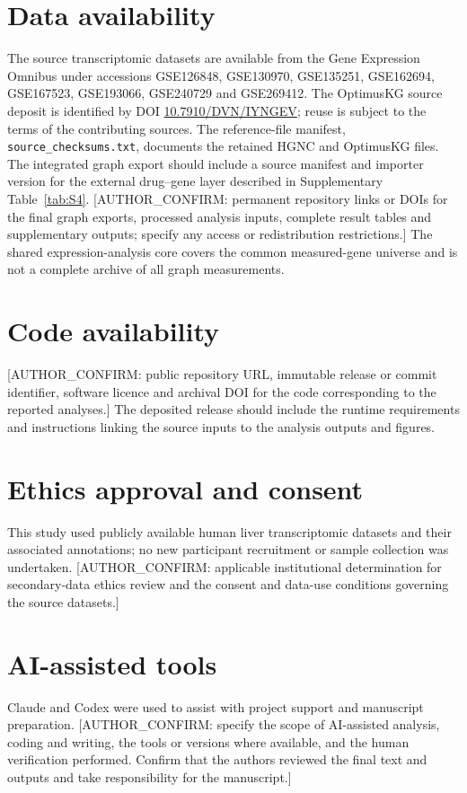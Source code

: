 \documentclass[11pt,a4paper]{article}
\begin{document}
\section*{Data availability}
The source transcriptomic datasets are available from the Gene Expression Omnibus under accessions GSE126848, GSE130970, GSE135251, GSE162694, GSE167523, GSE193066, GSE240729 and GSE269412. The OptimusKG source deposit is identified by DOI \href{https://doi.org/10.7910/DVN/IYNGEV}{10.7910/DVN/IYNGEV}; reuse is subject to the terms of the contributing sources. The reference-file manifest, \nolinkurl{source_checksums.txt}, documents the retained HGNC and OptimusKG files. The integrated graph export should include a source manifest and importer version for the external drug--gene layer described in Supplementary Table~\ref{tab:S4}. [AUTHOR\_CONFIRM: permanent repository links or DOIs for the final graph exports, processed analysis inputs, complete result tables and supplementary outputs; specify any access or redistribution restrictions.] The shared expression-analysis core covers the common measured-gene universe and is not a complete archive of all graph measurements.

\section*{Code availability}
[AUTHOR\_CONFIRM: public repository URL, immutable release or commit identifier, software licence and archival DOI for the code corresponding to the reported analyses.] The deposited release should include the runtime requirements and instructions linking the source inputs to the analysis outputs and figures.

\section*{Ethics approval and consent}
This study used publicly available human liver transcriptomic datasets and their associated annotations; no new participant recruitment or sample collection was undertaken. [AUTHOR\_CONFIRM: applicable institutional determination for secondary-data ethics review and the consent and data-use conditions governing the source datasets.]

\section*{AI-assisted tools}
Claude and Codex were used to assist with project support and manuscript preparation. [AUTHOR\_CONFIRM: specify the scope of AI-assisted analysis, coding and writing, the tools or versions where available, and the human verification performed. Confirm that the authors reviewed the final text and outputs and take responsibility for the manuscript.]
\end{document}
